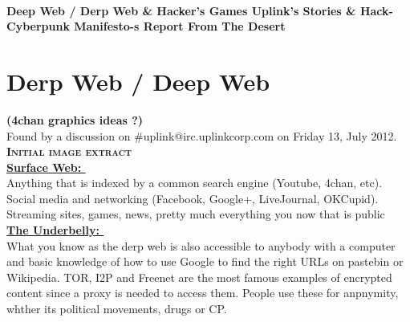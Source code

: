 \documentclass[11pt,twoside,a4paper]{book}
\title{\txtTITLE}
\date{ --- }
\def\txtBIGTITLE{Deep Web / Derp Web \& Hacker's Games \newline \newline Uplink's Stories \& Hack-Cyberpunk Manifesto-s \newline \newline Report From The Desert } %
\begin{document}

\setlength\parindent{0pt} %

	\setlength{\itemsep}{1pt}
	\setlength{\parskip}{0pt}
	\setlength{\parsep}{0pt}

~\\
\vfill

\begin{center}
	\textbf{\huge \txtBIGTITLE} ~\\	
\end{center}


\vfill

\tableofcontents

\chapter{Derp Web / Deep Web} %

\textbf{\large (4chan graphics ideas ?) }~\\

Found by a discussion on \#uplink@irc.uplinkcorp.com on Friday 13, July 2012. ~\\

\textbf{\Large \textsc{Initial image extract}}~\\

\noindent
\textbf{\underline{Surface Web: }}~\\
Anything that is indexed by a common search engine (Youtube, 4chan, etc).~\\
Social media and networking (Facebook, Google+, LiveJournal, OKCupid).~\\
Streaming sites, games, news, pretty much everything you now that is public~\\

\noindent
\textbf{\underline{The Underbelly: }}~\\
What you know as the derp web is also accessible to anybody with a computer and basic knowledge of how to use Google to find the right URLs on pastebin or Wikipedia. TOR, I2P and Freenet are the most famous examples of encrypted content since a proxy is needed to access them. People use these for anpnymity, whther its political movements, drugs or CP.~\\
\end{document}
